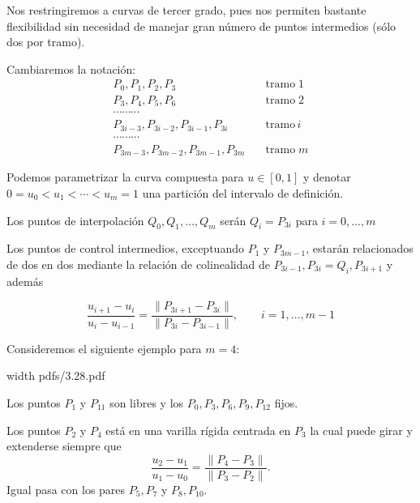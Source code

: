 \documentclass[twoside]{report}
\newcommand{\colocapdf}[2]{\quad\pdfimage width #2 {pdfs/#1.pdf}}
\begin{document}
\vspace{0.2cm}

Nos restringiremos a curvas de tercer grado, pues nos permiten bastante flexibilidad sin necesidad de manejar gran número de puntos intermedios (sólo dos por tramo).

\vspace{0.2cm}

Cambiaremos la notación:
$$\begin{array}{ll} P_0,P_1,P_2,P_3& \quad \mbox{tramo}\; 1\\P_3,P_4,P_5,P_6&\quad \mbox{tramo}\; 2\\ \cdots \cdots \cdots & \\ P_{3i-3},P_{3i-2},P_{3i-1},P_{3i} & \quad \mbox{tramo}\, i\\  \cdots \cdots \cdots & \\ P_{3m-3},P_{3m-2},P_{3m-1},P_{3m} & \quad \mbox{tramo}\; m \end{array}$$

\vspace{0.2cm}

Podemos parametrizar la curva compuesta para $u\in [0,1]$ y denotar $0=u_0<u_1< \cdots<u_m=1$ una partición del intervalo de definición.

\vspace{0.2cm}

Los puntos de interpolación $Q_0,Q_1,\ldots,Q_m$ serán $Q_i=P_{3i}$ para $i=0,\ldots,m$

Los puntos de control intermedios, exceptuando $P_1$ y $P_{3m-1}$, estarán relacionados de dos en dos mediante la relación de colinealidad de $P_{3i-1},P_{3i}=Q_i, P_{3i+1}$ y además

$$\frac{u_{i+1}-u_i}{u_i-u_{i-1}}= \frac{\parallel P_{3i+1}-P_{3i}\parallel}{\parallel P_{3i}-P_{3i-1} \parallel},\quad \quad i=1,\ldots,m-1$$

\vspace{0.2cm}

Consideremos el siguiente ejemplo para $m=4$:

\vspace{0.2cm}

\begin{minipage}{.4\textwidth}\colocapdf{3.28}{\textwidth}
\end{minipage} \quad \quad
\begin{minipage}{.55\textwidth}
Los puntos $P_1$ y $P_{11}$ son libres y los $P_0,P_3,P_6,P_9,P_{12}$ fijos.

Los puntos $P_2$ y $P_4$ está en una varilla rígida centrada en $P_3$ la cual puede girar y extenderse siempre que
$$\frac{u_2-u_1}{u_1-u_0}= \frac{\parallel P_4-P_3\parallel}{\parallel P_3-P_2 \parallel}.$$
Igual pasa con los pares $P_5,P_7$ y $P_8,P_{10}$.
\end{minipage}
\end{document}
